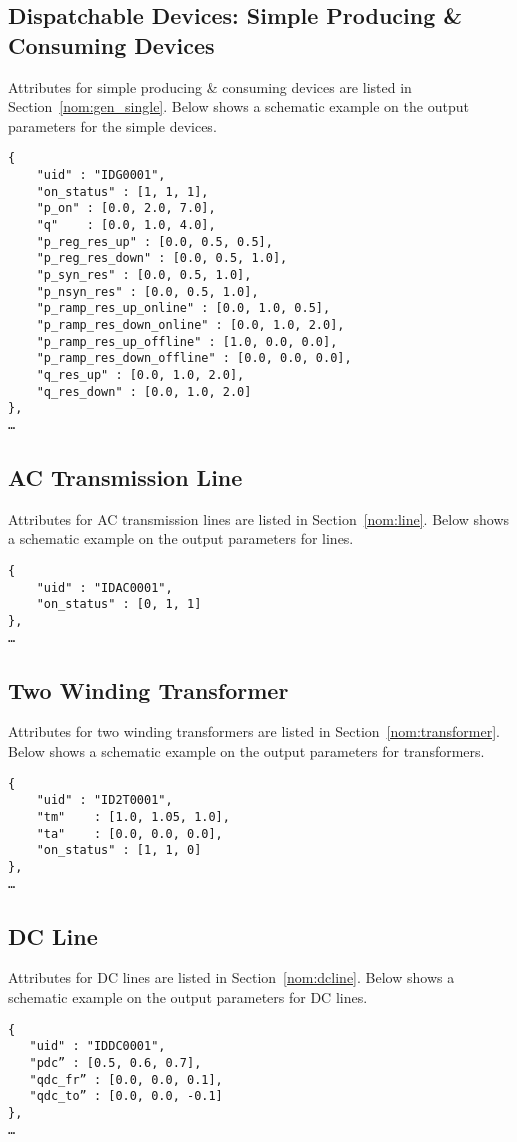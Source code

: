 \subsection{Dispatchable Devices: Simple Producing \& Consuming Devices}
Attributes for simple producing \& consuming devices are listed in Section~\ref{nom:gen_single}.
Below shows a schematic example on the output parameters for the simple devices.

\begin{verbatim}
{
    "uid" : "IDG0001",
    "on_status" : [1, 1, 1],
    "p_on" : [0.0, 2.0, 7.0],
    "q"    : [0.0, 1.0, 4.0],
    "p_reg_res_up" : [0.0, 0.5, 0.5],
    "p_reg_res_down" : [0.0, 0.5, 1.0],
    "p_syn_res" : [0.0, 0.5, 1.0],
    "p_nsyn_res" : [0.0, 0.5, 1.0],
    "p_ramp_res_up_online" : [0.0, 1.0, 0.5],
    "p_ramp_res_down_online" : [0.0, 1.0, 2.0],
    "p_ramp_res_up_offline" : [1.0, 0.0, 0.0],
    "p_ramp_res_down_offline" : [0.0, 0.0, 0.0],
    "q_res_up" : [0.0, 1.0, 2.0],
    "q_res_down" : [0.0, 1.0, 2.0]
},
…     
\end{verbatim}

\subsection{AC Transmission Line}
Attributes for AC transmission lines are listed in Section~\ref{nom:line}.
Below shows a schematic example on the output parameters for lines.

\begin{verbatim}
{
    "uid" : "IDAC0001",
    "on_status" : [0, 1, 1]
},
…     
\end{verbatim}



\subsection{Two Winding Transformer}
Attributes for two winding transformers are listed in Section~\ref{nom:transformer}.
Below shows a schematic example on the output parameters for transformers.

\begin{verbatim}
{
    "uid" : "ID2T0001",
    "tm"    : [1.0, 1.05, 1.0],
    "ta"    : [0.0, 0.0, 0.0],
    "on_status" : [1, 1, 0]
},
…     
\end{verbatim}

\subsection{DC Line}
Attributes for DC lines are listed in Section~\ref{nom:dcline}.
Below shows a schematic example on the output parameters for DC lines.
\begin{verbatim}
{
   "uid" : "IDDC0001",
   "pdc” : [0.5, 0.6, 0.7],
   "qdc_fr” : [0.0, 0.0, 0.1],
   "qdc_to” : [0.0, 0.0, -0.1]
},
…    
\end{verbatim}




